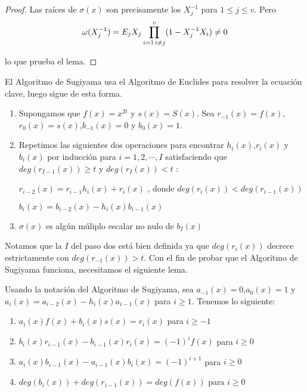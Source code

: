 \begin{proof}
Las raíces de $\sigma(x)$ son precisamente los $X_j^{-1}$ para $ 1 \leq j \leq v$. Pero 
\[
\omega(X_j^{-1}) = E_jX_j \prod_{i=1 \thinspace i \neq j}^v (1-X_j^{-1}X_i) \neq 0
\]

lo que prueba el lema.
\end{proof}

El Algoritmo de Sugiyama usa el Algoritmo de Euclides para resolver la ecuación clave, luego sigue de esta forma.

\begin{enumerate}
\item Supongamos que $f(x) = x^{2t}$ y $s(x) = S(x)$. Sea $r_{-1}(x) = f(x)$,$r_0(x) = s(x)$,$b_{-1}(x) = 0$ y $b_0(x) = 1$. 
\item  Repetimos las siguientes dos operaciones para encontrar $h_i(x)$,$r_i(x)$ y $b_i(x)$ por inducción para $i = 1,2,\cdots , I$ satisfaciendo que $deg(r_{I-1}(x)) \geq t$ y $deg(r_{I}(x)) < t$ :


$r_{i-2}(x) = r_{i-1}h_i(x) + r_i(x)$ , donde  $deg(r_i(x)) < deg(r_{i-1}(x))$


$ b_i(x) = b_{i-2}(x) - h_i(x)b_{i-1}(x)$
\item $\sigma(x)$ es algún múliplo escalar no nulo de $b_I(x)$
\end{enumerate}

Notamos que la $I$ del paso dos está bien definida ya que $deg(r_i(x))$ decrece estrictamente con $deg(r_{-1}(x)) > t$. Con el fin de probar que el Algoritmo de Sugiyama funciona, necesitamos el siguiente lema.

\begin{lemma}
\label{le:tocho_sugiyama}
Usando la notación del Algoritmo de Sugiyama, sea $a_{-1}(x) = 0$,$a_0(x) = 1$ y $ a_i(x) = a_{i-2}(x) - h_i(x)a_{i-1}(x)$ para $ i \geq 1$. Tenemos lo siguiente:
\begin{enumerate}
	\item $a_i(x)f(x) + b_i(x)s(x) = r_i(x)$ para $ i \geq -1$
	\item $b_i(x)r_{i-1}(x) - b_{i-1}(x)r_i(x) = (-1)^i f(x)$ para $ i \geq 0$
	\item $a_i(x)b_{i-1}(x) - a_{i-1}(x)b_i(x) = (-1)^{i+1} $ para $ i \geq 0$
	\item $deg(b_i(x)) + deg(r_{i-1}(x)) = deg(f(x))$ para $ i \geq 0$
\end{enumerate}

\end{lemma}

